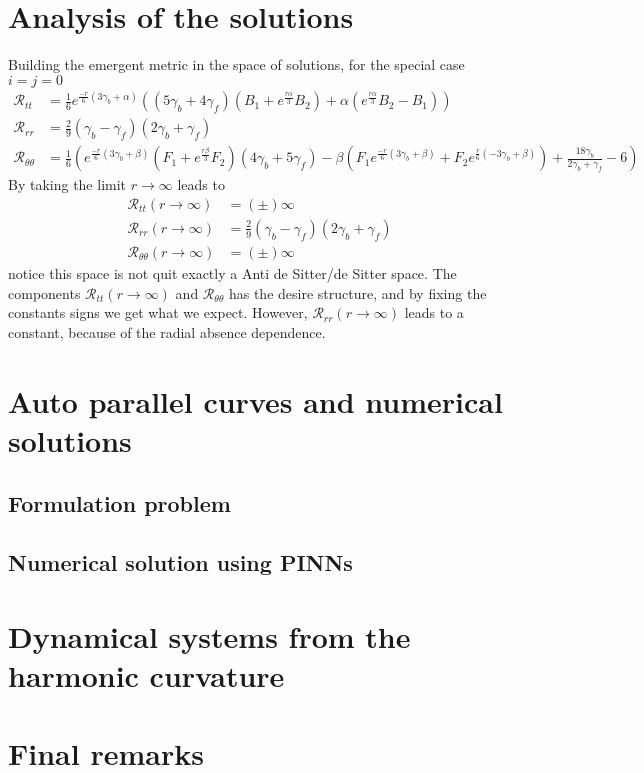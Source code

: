 \documentclass{article}
\begin{document}
\section{Analysis of the solutions}

Building the emergent metric in the space of solutions, for the special case $ i = j = 0$
\begin{align}
    \mathcal{R}_{tt} & = \frac{1}{6}e^{\frac{-r}{6}\left(3\gamma_b + \alpha\right)}\left(\left(5\gamma_b + 4\gamma_f\right)
    \left(B_1 +e^{\frac{r\alpha}{3}}B_2\right) + \alpha\left(e^{\frac{r\alpha}{3}}B_2 - B_1\right)\right) \\
    \mathcal{R}_{rr} & = \frac{2}{9}\left(\gamma_b - \gamma_f\right)\left(2\gamma_b + \gamma_f\right)\\
    \mathcal{R}_{\theta\theta} & = \frac{1}{6}\left(e^{\frac{-r}{6}\left(3\gamma_b + \beta\right)}\left(F_1 + e^{\frac{r\beta}{3}}F_2\right)\left(4\gamma_b + 5\gamma_f\right) - 
    \beta\left(F_1 e^{\frac{-r}{6}\left(3\gamma_b + \beta\right)} + F_2 e^{\frac{r}{6}\left(-3\gamma_b + \beta\right)}\right) + \frac{18\gamma_b}{2\gamma_b + \gamma_f} - 6\right)
\end{align}
By taking the limit $r \to \infty$ leads to
\begin{align}
    \mathcal{R}_{tt}(r \to \infty) & = (\pm)\infty \\
    \mathcal{R}_{rr}(r \to \infty) & = \frac{2}{9}\left(\gamma_b - \gamma_f\right)\left(2\gamma_b + \gamma_f\right)\\
    \mathcal{R}_{\theta\theta}(r \to \infty) & = (\pm)\infty
\end{align}
notice this space is not quit exactly a Anti de Sitter/de Sitter space. The components $\mathcal{R}_{tt}(r \to \infty)$
and $\mathcal{R}_{\theta\theta}$ has the desire structure, and by fixing the constants signs we get what we expect. However,
$\mathcal{R}_{rr}(r \to \infty)$ leads to a constant, because of the radial absence dependence. 

\section{Auto parallel curves and numerical solutions}

\subsection{Formulation problem}

\subsection{Numerical solution using PINNs}

\section{Dynamical systems from the harmonic curvature}

\section{Final remarks}
\label{sec:final_remarks}



\end{document}
